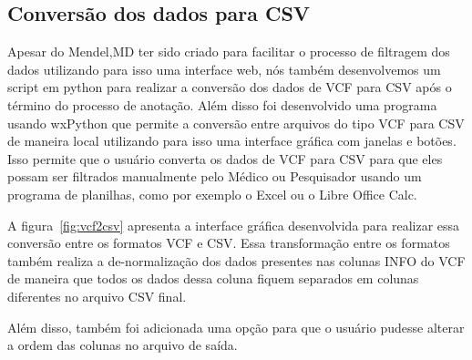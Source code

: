 \subsection{Conversão dos dados para CSV}

Apesar do Mendel,MD ter sido criado para facilitar o processo de filtragem dos dados utilizando para isso uma interface web, nós também desenvolvemos um script em python para realizar a conversão dos dados de VCF para CSV após o término do processo de anotação. Além disso foi desenvolvido uma programa usando wxPython que permite a conversão entre arquivos do tipo VCF para CSV de maneira local utilizando para isso uma interface gráfica com janelas e botões. Isso permite que o usuário converta os dados de VCF para CSV para que eles possam ser filtrados manualmente pelo Médico ou Pesquisador usando um programa de planilhas, como por exemplo o Excel ou o Libre Office Calc.

A figura~\ref{fig:vcf2csv} apresenta a interface gráfica desenvolvida para realizar essa conversão entre os formatos VCF e CSV. Essa transformação entre os formatos também realiza a de-normalização dos dados presentes nas colunas INFO do VCF de maneira que todos os dados dessa coluna fiquem separados em colunas diferentes no arquivo CSV final.

Além disso, também foi adicionada uma opção para que o usuário pudesse alterar a ordem das colunas no arquivo de saída.


